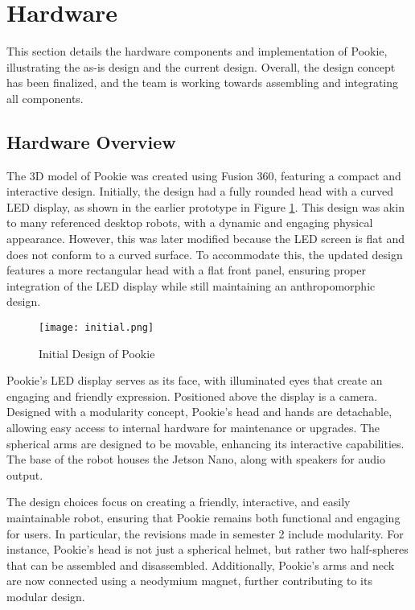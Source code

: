\section{Hardware}
This section details the hardware components and implementation of Pookie, illustrating the as-is design and the current design. Overall, the design concept has been finalized, and the team is working towards assembling and integrating all components. 

\subsection{Hardware Overview}
The 3D model of Pookie was created using Fusion 360, featuring a compact and interactive design. Initially, the design had a fully rounded head with a curved LED display, as shown in the earlier prototype in Figure \ref{fig:initial}. This design was akin to many referenced desktop robots, with a dynamic and engaging physical appearance. However, this was later modified because the LED screen is flat and does not conform to a curved surface. To accommodate this, the updated design features a more rectangular head with a flat front panel, ensuring proper integration of the LED display while still maintaining an anthropomorphic design. 

\begin{figure}[ht]
    \centering
    \texttt{[image: initial.png]}
    \caption{Initial Design of Pookie}
    \label{fig:initial}
\end{figure}

Pookie’s LED display serves as its face, with illuminated eyes that create an engaging and friendly expression. Positioned above the display is a camera. Designed with a modularity concept, Pookie’s head and hands are detachable, allowing easy access to internal hardware for maintenance or upgrades. The spherical arms are designed to be movable, enhancing its interactive capabilities. The base of the robot houses the Jetson Nano, along with speakers for audio output. 

The design choices focus on creating a friendly, interactive, and easily maintainable robot, ensuring that Pookie remains both functional and engaging for users. In particular, the revisions made in semester 2 include modularity. For instance, Pookie’s head is not just a spherical helmet, but rather two half-spheres that can be assembled and disassembled. Additionally, Pookie’s arms and neck are now connected using a neodymium magnet, further contributing to its modular design. 

